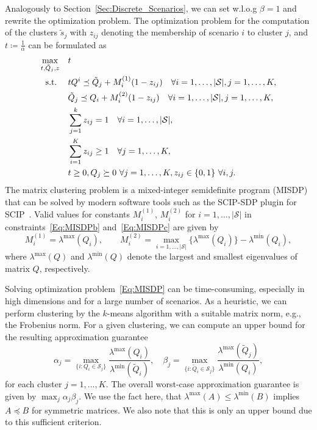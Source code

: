 \documentclass{article}
\newcommand{\mS}{\mathcal{S}}
\begin{document}
Analogously to Section~\ref{Sec:Discrete_Scenarios}, we can set w.l.o.g $\beta=1$ and rewrite the optimization problem.
The optimization problem for the computation of the clusters \(\tilde{s}_j\) with \(z_{ij}\) denoting the membership of scenario $i$ to cluster $j$, and \(t\coloneqq \frac{1}{\alpha}\) can be formulated as
\begin{subequations}\label{Eq:MISDP}
	\begin{align}
		\max_{t,\tilde{Q}_j,z} \quad & t \label{Eq:MISDPa}\\
		\text{ s.t. } \hspace{0.3cm} &  tQ^i \preceq  \tilde{Q}_j + M_i^{(1)}(1-z_{ij})\quad \forall i=1,\ldots,|\mS|, j=1,\ldots,K, \label{Eq:MISDPb}
		\\
		& \tilde{Q}_j \preceq  Q_i + M_i^{(2)}(1-z_{ij}) \quad \forall i=1,\ldots,|\mS|, j=1,\ldots,K, 	\label{Eq:MISDPc}
		\\
		&\sum_{j=1}^{k} z_{ij} = 1 \quad \forall i=1,\ldots,|\mS|, \label{Eq:MISDPd}
		\\
		& \sum_{i=1}^{K}z_{ij} \geq 1 \quad \forall j=1,\ldots,K, \label{Eq:MISDPe}
		\\
		& t\geq 0,Q_j\succeq 0 \text{ }\forall j=1,\ldots,K,  z_{ij} \in \{0,1\}\text{ } \forall i,j. \label{Eq:MISDPf}
	\end{align}
\end{subequations}
The matrix clustering problem is a mixed-integer semidefinite program (MISDP) that can be solved by modern software tools such as the SCIP-SDP plugin for SCIP~\cite{SCIP}.
Valid values for constants $M_i^{(1)}$, $M_i^{(2)}$ for $i=1, \ldots, \vert \mS \vert$ in constraints~\eqref{Eq:MISDPb} and~\eqref{Eq:MISDPc} are given by
\begin{equation}
	M^{(1)}_i= \lambda^{\text{max}}(Q_i), \quad\quad
	M^{(2)}_i= \max_{i=1,\ldots,|\mS|}\{\lambda^{\text{max}}(Q_i)\} - \lambda^{\text{min}}(Q_i),
\end{equation}
where \(\lambda^{\text{max}}(Q)\) and \(\lambda^{\text{min}}(Q)\) denote the largest and smallest eigenvalues of matrix $Q$, respectively.

Solving optimization problem~\eqref{Eq:MISDP} can be time-consuming, especially in high dimensions and for a large number of scenarios.
As a heuristic, we can perform clustering by the $k$-means algorithm with a suitable matrix norm, e.g., the Frobenius norm.
For a given clustering, we can compute an upper bound for the resulting approximation guarantee
\begin{equation}
	\alpha_j = \max_{\{i\colon Q_i \in \mS_{j}\}}\frac{ \lambda^{\text{max}}(Q_i) }{ \lambda^{\text{min}}(\tilde{Q}_i)  }, \quad
	\beta_j = \max_{\{i\colon \tilde{Q}_{i} \in \mS_{j}\}}\frac{ \lambda^{\text{max}}(\tilde{Q}_{j}) }{ \lambda^{\text{min}}(Q_{i})  }, \label{eq:eigvals}
\end{equation}
for each cluster \(j=1,\dots,K\).
The overall worst-case approximation guarantee is given by \(\max_j\alpha_j \beta_j\).
We use the fact here, that \(\lambda^{\text{max}}(A)\leq\lambda^{\text{min}}(B)\) implies \(A\preceq B\) for symmetric matrices.
We also note that this is only an upper bound due to this sufficient criterion.
\end{document}
